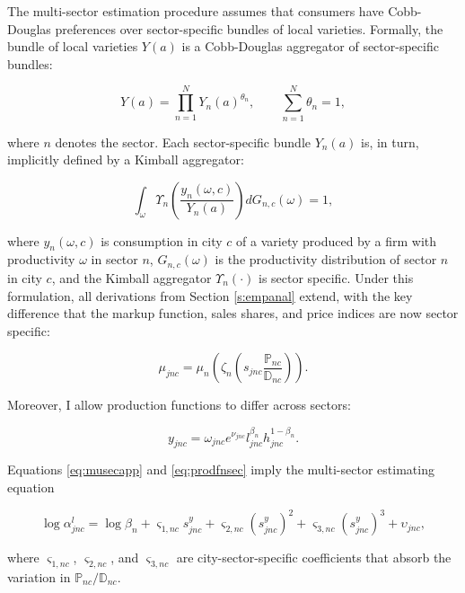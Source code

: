 The multi-sector estimation procedure assumes that consumers have Cobb-Douglas preferences over sector-specific bundles of local varieties. Formally, the bundle of local varieties $Y(a)$ is a Cobb-Douglas aggregator of sector-specific bundles:

\begin{equation*}
Y(a) = \prod_{n = 1}^N Y_n(a)^{\theta_n}, \qquad \sum_{n=1}^N \theta_n = 1,
\end{equation*}

where $n$ denotes the sector. Each sector-specific bundle $Y_n(a)$ is, in turn, implicitly defined by a Kimball aggregator:

\begin{equation*}
\int_\omega \Upsilon_n\left(\frac{y_n(\omega,c)}{Y_n(a)}\right) dG_{n,c}(\omega) = 1,
\end{equation*}

where $y_n(\omega,c)$ is consumption in city $c$ of a variety produced by a firm with productivity $\omega$ in sector $n$, $G_{n,c}(\omega)$ is the productivity distribution of sector $n$ in city $c$, and the Kimball aggregator $\Upsilon_n(\cdot)$ is sector specific. Under this formulation, all derivations from Section \ref{s:empanal} extend, with the key difference that the markup function, sales shares, and price indices are now sector specific:

\begin{equation}\label{eq:musecapp}
\mu_{jnc} = \mu_n\left(\zeta_n\left( s_{jnc} \frac{\mathbb{P}_{nc}}{\mathbb{D}_{nc}}\right) \right).
\end{equation}

Moreover, I allow production functions to differ across sectors:

\begin{equation}\label{eq:prodfnsec}
y_{jnc} = \omega_{jnc}e^{\nu_{jnc}} l_{jnc}^{\beta_n} h_{jnc}^{1-\beta_n}.
\end{equation}

Equations \eqref{eq:musecapp} and \eqref{eq:prodfnsec} imply the multi-sector estimating equation

\begin{equation}\label{eq:estequsec}
\log \alpha_{jnc}^l = \log \beta_n + \varsigma_{1,nc} s^y_{jnc} + \varsigma_{2,nc} (s^y_{jnc})^2 + \varsigma_{3,nc} (s^y_{jnc})^3 + \upsilon_{jnc},
\end{equation}

where $\varsigma_{1,nc}$, $\varsigma_{2,nc}$, and $\varsigma_{3,nc}$ are city-sector-specific coefficients that absorb the variation in $\mathbb{P}_{nc}/\mathbb{D}_{nc}$.


